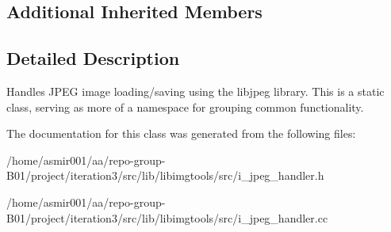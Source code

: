 \subsection*{Additional Inherited Members}


\subsection{Detailed Description}
Handles J\+P\+EG image loading/saving using the libjpeg library. This is a static class, serving as more of a namespace for grouping common functionality. 

The documentation for this class was generated from the following files\+:\begin{DoxyCompactItemize}
\item 
/home/asmir001/aa/repo-\/group-\/\+B01/project/iteration3/src/lib/libimgtools/src/i\+\_\+jpeg\+\_\+handler.\+h\item 
/home/asmir001/aa/repo-\/group-\/\+B01/project/iteration3/src/lib/libimgtools/src/i\+\_\+jpeg\+\_\+handler.\+cc\end{DoxyCompactItemize}
